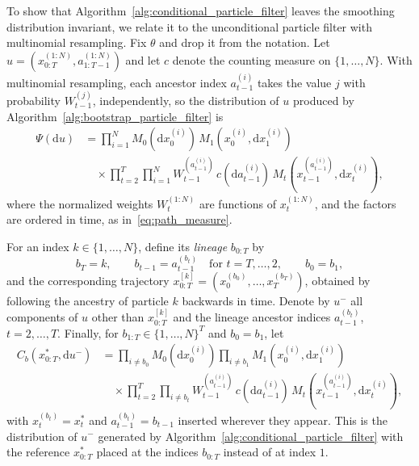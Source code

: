 To show that Algorithm~\ref{alg:conditional_particle_filter} leaves the smoothing distribution invariant, we relate it to the unconditional particle filter with multinomial resampling. Fix $\theta$ and drop it from the notation. Let $u = (x_{0:T}^{(1:N)},a_{1:T-1}^{(1:N)})$ and let $c$ denote the counting measure on $\{1,\ldots,N\}$. With multinomial resampling, each ancestor index $a_{t-1}^{(i)}$ takes the value $j$ with probability $W_{t-1}^{(j)}$, independently, so the distribution of $u$ produced by Algorithm~\ref{alg:bootstrap_particle_filter} is
\begin{align}
    \Psi(\mathrm{d}u) &= \prod_{i=1}^{N}M_0(\mathrm{d}x_0^{(i)})\,M_1(x_0^{(i)},\mathrm{d}x_1^{(i)}) \\
    &\quad\times\prod_{t=2}^{T}\prod_{i=1}^{N}W_{t-1}^{(a_{t-1}^{(i)})}\,c(\mathrm{d}a_{t-1}^{(i)})\,M_t\left(x_{t-1}^{(a_{t-1}^{(i)})},\mathrm{d}x_t^{(i)}\right),
    \label{eq:pf_auxiliary_measure}
\end{align}
where the normalized weights $W_t^{(1:N)}$ are functions of $x_t^{(1:N)}$, and the factors are ordered in time, as in~\eqref{eq:path_measure}.

For an index $k\in\{1,\ldots,N\}$, define its \emph{lineage} $b_{0:T}$ by
\begin{equation}
    b_T = k, \qquad b_{t-1} = a_{t-1}^{(b_t)}\quad\text{for }t=T,\ldots,2, \qquad b_0 = b_1,
\end{equation}
and the corresponding trajectory $x_{0:T}^{[k]} = (x_0^{(b_0)},\ldots,x_T^{(b_T)})$, obtained by following the ancestry of particle $k$ backwards in time. Denote by $u^-$ all components of $u$ other than $x_{0:T}^{[k]}$ and the lineage ancestor indices $a_{t-1}^{(b_t)}$, $t=2,\ldots,T$. Finally, for $b_{1:T}\in\{1,\ldots,N\}^T$ and $b_0 = b_1$, let
\begin{align}
    C_b(x_{0:T}^*,\mathrm{d}u^-) &= \prod_{i\neq b_0}M_0(\mathrm{d}x_0^{(i)})\prod_{i\neq b_1}M_1(x_0^{(i)},\mathrm{d}x_1^{(i)}) \\
    &\quad\times\prod_{t=2}^{T}\prod_{i\neq b_t}W_{t-1}^{(a_{t-1}^{(i)})}\,c(\mathrm{d}a_{t-1}^{(i)})\,M_t\left(x_{t-1}^{(a_{t-1}^{(i)})},\mathrm{d}x_t^{(i)}\right),
\end{align}
with $x_t^{(b_t)} = x_t^*$ and $a_{t-1}^{(b_t)} = b_{t-1}$ inserted wherever they appear. This is the distribution of $u^-$ generated by Algorithm~\ref{alg:conditional_particle_filter} with the reference $x_{0:T}^*$ placed at the indices $b_{0:T}$ instead of at index $1$.


